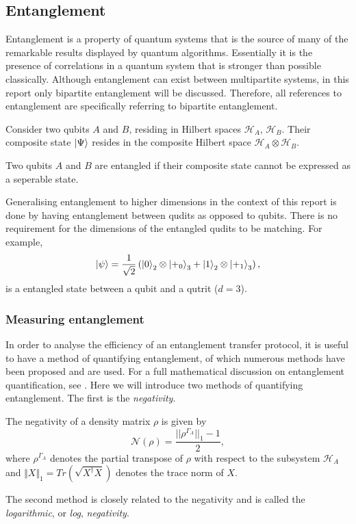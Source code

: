 \subsection{Entanglement}
Entanglement is a property of quantum systems that is the source of many of the remarkable results displayed by quantum algorithms.
Essentially it is the presence of correlations in a quantum system that is stronger than possible classically.
Although entanglement can exist between multipartite systems, in this report only bipartite entanglement will be discussed.
Therefore, all references to entanglement are specifically referring to bipartite entanglement.
\begin{definition}
    Consider two qubits $A$ and $B$, residing in Hilbert spaces $\mathcal{H}_A$, $\mathcal{H}_B$. Their composite state $\ket{\Psi}$ resides in the composite Hilbert space $\mathcal{H}_A \otimes \mathcal{H}_B$.
\end{definition}
\begin{definition}
    Two qubits $A$ and $B$ are entangled if their composite state cannot be expressed as a seperable state.
\end{definition}
Generalising entanglement to higher dimensions in the context of this report is done by having entanglement between qudits as opposed to qubits. There is no requirement for the dimensions of the entangled qudits to be matching. For example,
\begin{equation}
    \ket{\psi} = \frac{1}{\sqrt{2}}\left(\ket{0}_2\otimes\ket{+_0}_3 + \ket{1}_2\otimes\ket{+_1}_3\right),
\end{equation}
is a entangled state between a qubit and a qutrit ($d=3$).

\subsubsection{Measuring entanglement}
\label{subsubsection:measure_entanglement}
In order to analyse the efficiency of an entanglement transfer protocol, it is useful to have a method of quantifying entanglement, of which numerous methods have been proposed and are used.
For a full mathematical discussion on entanglement quantification, see \cite{Plenio_2007}.
Here we will introduce two methods of quantifying entanglement.
The first is the \emph{negativity}.
\begin{definition}[Negativity]
    \label{definition:negativity}
    The negativity of a density matrix $\rho$ is given by
    \begin{equation}
        \mathcal{N}(\rho) = \frac{||\rho^{\Gamma_A}||_1-1}{2},
    \end{equation}
    where $\rho^{\Gamma_A}$ denotes the partial transpose of $\rho$ with respect to the subsystem $\mathcal{H}_A$ and $\Vert X\Vert_1 = Tr(\sqrt{X^\dagger X})$ denotes the trace norm of $X$.
\end{definition}
The second method is closely related to the negativity and is called the \emph{logarithmic}, or \emph{log}, \emph{negativity}.

